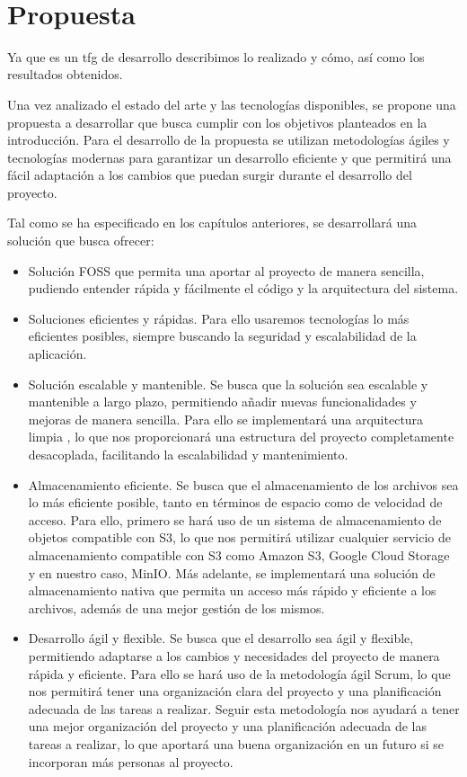 \newpage
~
\newpage
\section{Propuesta}
Ya que es un tfg de desarrollo describimos lo realizado y cómo, así como los resultados obtenidos.

Una vez analizado el estado del arte y las tecnologías disponibles, se propone una propuesta a desarrollar que busca cumplir con los objetivos planteados en la introducción. Para el desarrollo de la propuesta se utilizan metodologías ágiles y tecnologías modernas para garantizar un desarrollo eficiente y que permitirá una fácil adaptación a los cambios que puedan surgir durante el desarrollo del proyecto.

Tal como se ha especificado en los capítulos anteriores, se desarrollará una solución que busca ofrecer:
\begin{itemize}
    \item Solución FOSS que permita una aportar al proyecto de manera sencilla, pudiendo entender rápida y fácilmente el código y la arquitectura del sistema.
    \item Soluciones eficientes y rápidas. Para ello usaremos tecnologías lo más eficientes posibles, siempre buscando la seguridad y escalabilidad de la aplicación.
    \item Solución escalable y mantenible. Se busca que la solución sea escalable y mantenible a largo plazo, permitiendo añadir nuevas funcionalidades y mejoras de manera sencilla. Para ello se implementará una arquitectura limpia \parencite{uncle-bob-clean-architecture}, lo que nos proporcionará una estructura del proyecto completamente desacoplada, facilitando la escalabilidad y mantenimiento.
    \item Almacenamiento eficiente. Se busca que el almacenamiento de los archivos sea lo más eficiente posible, tanto en términos de espacio como de velocidad de acceso.
        Para ello, primero se hará uso de un sistema de almacenamiento de objetos compatible con S3, lo que nos permitirá utilizar cualquier servicio de almacenamiento compatible con S3 como Amazon S3, Google Cloud Storage y en nuestro caso, MinIO.
        Más adelante, se implementará una solución de almacenamiento nativa que permita un acceso más rápido y eficiente a los archivos, además de una mejor gestión de los mismos.
    \item Desarrollo ágil y flexible. Se busca que el desarrollo sea ágil y flexible, permitiendo adaptarse a los cambios y necesidades del proyecto de manera rápida y eficiente. Para ello se hará uso de la metodología ágil Scrum, lo que nos permitirá tener una organización clara del proyecto y una planificación adecuada de las tareas a realizar.
        Seguir esta metodología nos ayudará a tener una mejor organización del proyecto y una planificación adecuada de las tareas a realizar, lo que aportará una buena organización en un futuro si se incorporan más personas al proyecto.
\end{itemize}

